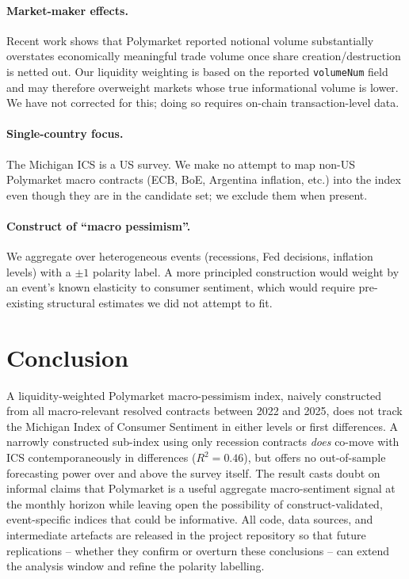 \documentclass{article}
\begin{document}
\paragraph{Market-maker effects.}
Recent work \citep{tsang2026anatomy} shows that Polymarket reported
notional volume substantially overstates economically meaningful trade
volume once share creation/destruction is netted out. Our
liquidity weighting is based on the reported \texttt{volumeNum}
field and may therefore overweight markets whose true informational
volume is lower. We have not corrected for this; doing so requires
on-chain transaction-level data.

\paragraph{Single-country focus.}
The Michigan ICS is a US survey. We make no attempt to map non-US
Polymarket macro contracts (ECB, BoE, Argentina inflation, etc.) into
the index even though they are in the candidate set; we exclude them
when present.

\paragraph{Construct of ``macro pessimism''.}
We aggregate over heterogeneous events (recessions, Fed decisions,
inflation levels) with a $\pm 1$ polarity label. A more principled
construction would weight by an event's known elasticity to consumer
sentiment, which would require pre-existing structural estimates we did
not attempt to fit.

\section{Conclusion}

A liquidity-weighted Polymarket macro-pessimism index, naively
constructed from all macro-relevant resolved contracts between 2022 and
2025, does not track the Michigan Index of Consumer Sentiment in either
levels or first differences. A narrowly constructed sub-index using
only recession contracts \emph{does} co-move with ICS contemporaneously
in differences ($R^2 = 0.46$), but offers no out-of-sample forecasting
power over and above the survey itself. The result casts doubt on
informal claims that Polymarket is a useful aggregate macro-sentiment
signal at the monthly horizon while leaving open the possibility of
construct-validated, event-specific indices that could be informative.
All code, data sources, and intermediate artefacts are released in
the project repository so that future replications -- whether they
confirm or overturn these conclusions -- can extend the analysis
window and refine the polarity labelling.



\end{document}
